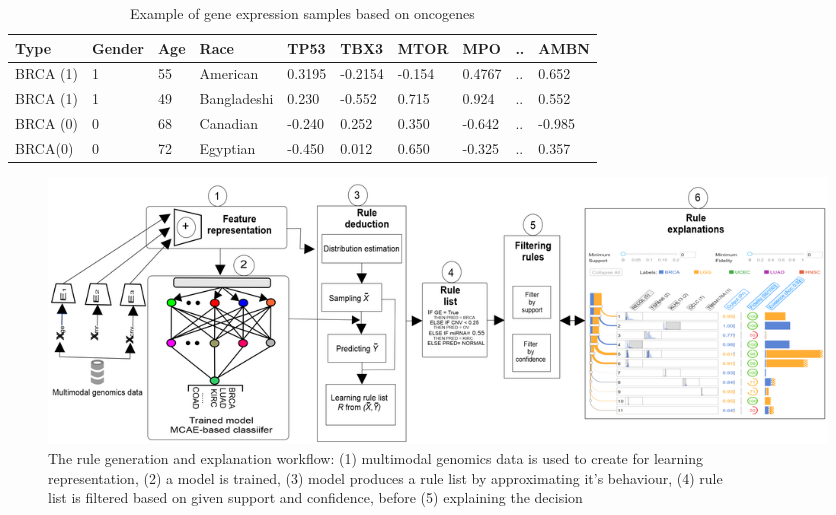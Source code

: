 \begin{table}[h!]
    \caption{Example of gene expression samples based on oncogenes}
    \label{ge:ancor_example}
    \vspace{-6mm}
    \begin{center}
        \scriptsize
        \begin{tabular}{l|l|l|l|l|l|l|l|l|l}
            \hline
            \rowcolor{Gray}
            \textbf{Type} & \textbf{Gender} & \textbf{Age} & \textbf{Race} & \textbf{TP53} & \textbf{TBX3} & \textbf{MTOR} & \textbf{MPO}  & .. & \textbf{AMBN} \\\hline    
            BRCA (1) & 1 & 55 & American & 0.3195 & -0.2154 & -0.154 & 0.4767  & .. & 0.652 \\\hline
            BRCA (1) & 1 & 49 & Bangladeshi & 0.230 &  -0.552  & 0.715  & 0.924   & .. & 0.552 \\\hline
            BRCA (0) & 0 & 68 & Canadian & -0.240 &  0.252  & 0.350  & -0.642  & .. & -0.985 \\\hline
            BRCA(0) & 0 & 72 & Egyptian & -0.450 &  0.012  & 0.650  & -0.325  & .. & 0.357 \\\hline
        \end{tabular}
        \vspace{-4mm}
    \end{center}
\end{table}


\begin{figure}
	\centering
		\includegraphics[scale=0.75]{images/rules_wf.png}
	    \caption[The rule generation and explanation workflow]{The rule generation and explanation workflow: (1) multimodal genomics data is used to create for learning\\ representation, (2) a model is trained, (3) model produces a rule list by approximating it's behaviour, (4) rule\\ list is filtered based on given support and confidence, before (5) explaining the decision} 
	    \label{fig:rules_wf}
\end{figure}

